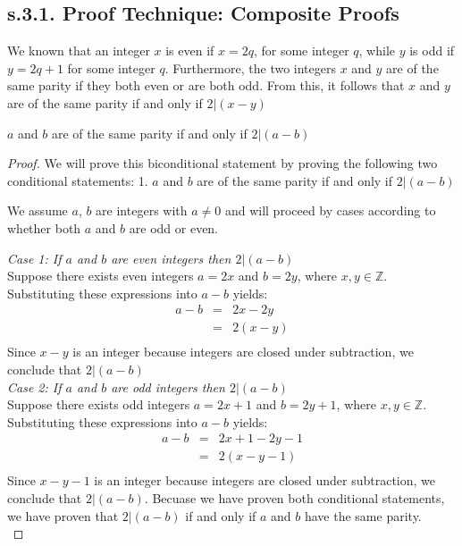 \subsection{s.3.1. Proof Technique: Composite Proofs}
\begin{example}
We known that an integer $x$ is even if $x = 2q$, for some integer $q$, while $y$ is odd if $y = 2q + 1$ for some integer $q$. Furthermore, the two integers $x$ and $y$ are of the same parity if they both even or are both odd. From this, it follows that $x$ and $y$ are of the same parity if and only if $2 | (x-y)$

\begin{tcolorbox}
	\begin{theorem}
		$a$ and $b$ are of the same parity if and only if $2 | (a - b)$
	\end{theorem}
\end{tcolorbox}

\begin{proof}
We will prove this biconditional statement by proving the following two conditional statements: 
1. $a$ and $b$ are of the same parity if and only if $2 | (a - b)$




We assume $a$, $b$ are integers with $a \neq 0$ and will proceed by cases according to whether both $a$ and $b$ are odd or even. 

{\it Case 1: If $a$ and $b$ are even integers then $2 | (a-b)$} \\
Suppose there exists even integers $a = 2x$ and $b = 2y$, where $x, y \in \mathbb{Z}$. Substituting these expressions into $a-b$ yields:
\begin{eqnarray*}
	a-b & = & 2x - 2y \nonumber \\	
	& = & 2(x-y) \nonumber \\
\end{eqnarray*}
Since $x-y$ is an integer because integers are closed under subtraction, we conclude that $2 | (a - b)$ \\


{\it Case 2: If $a$ and $b$ are odd integers then $2 | (a-b)$} \\
Suppose there exists odd integers $a = 2x + 1$ and $b = 2y + 1$, where $x, y \in \mathbb{Z}$. Substituting these expressions into $a-b$ yields:
\begin{eqnarray*}
	a-b & = & 2x + 1 - 2y - 1 \nonumber \\	
	& = & 2(x - y - 1) \nonumber \\
\end{eqnarray*}
Since $x-y-1$ is an integer because integers are closed under subtraction, we conclude that $2 | (a - b)$. Becuase we have proven both conditional statements, we have proven that $2 | (a-b)$ if and only if $a$ and $b$ have the same parity. \\
\end{proof}




\end{example}
